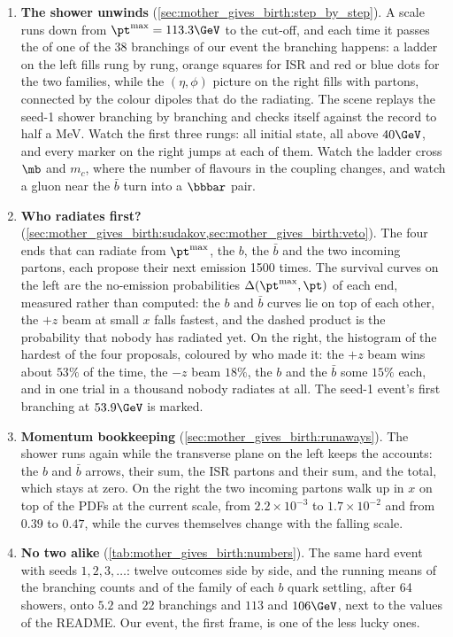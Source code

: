 \begin{enumerate}
  \item \textbf{The shower unwinds} (\cref{sec:mother_gives_birth:step_by_step}).
    A scale runs down from $\pt^{\max}=113.3\GeV$ to the cut-off, and each
    time it passes the \pt of one of the 38 branchings of our event the
    branching happens: a ladder on the left fills rung by rung, orange
    squares for ISR and red or blue dots for the two families, while the
    $(\eta,\phi)$ picture on the right fills with partons, connected by the
    colour dipoles that do the radiating. The scene replays the seed-1
    shower branching by branching and checks itself against the record to
    half a MeV. Watch the first three rungs: all initial state, all above
    $40\GeV$, and every marker on the right jumps at each of them. Watch the
    ladder cross $\mb$ and $m_c$, where the number of flavours in the
    coupling changes, and watch a gluon near the $\bar b$ turn into a
    $\bbbar$ pair.
  \item \textbf{Who radiates first?} (\cref{sec:mother_gives_birth:sudakov,sec:mother_gives_birth:veto}).
    The four ends that can radiate from $\pt^{\max}$, the $b$, the $\bar b$
    and the two incoming partons, each propose their next emission 1500
    times. The survival curves on the left are the no-emission probabilities
    $\Delta(\pt^{\max},\pt)$ of each end, measured rather than computed:
    the $b$ and $\bar b$ curves lie on top of each other, the $+z$ beam at
    small $x$ falls fastest, and the dashed product is the probability that
    nobody has radiated yet. On the right, the histogram of the hardest of
    the four proposals, coloured by who made it: the $+z$ beam wins about
    $53\%$ of the time, the $-z$ beam $18\%$, the $b$ and the $\bar b$ some
    $15\%$ each,
    and in one trial in a thousand nobody radiates at all. The seed-1
    event's first branching at $53.9\GeV$ is marked.
  \item \textbf{Momentum bookkeeping} (\cref{sec:mother_gives_birth:runaways}).
    The shower runs again while the transverse plane on the left keeps the
    accounts: the $b$ and $\bar b$ arrows, their sum, the ISR partons and
    their sum, and the total, which stays at zero. On the right the two
    incoming partons walk up in $x$ on top of the PDFs at the current
    scale, from $2.2\times10^{-3}$ to $1.7\times10^{-2}$ and from $0.39$ to
    $0.47$, while the curves themselves change with the falling scale.
  \item \textbf{No two alike} (\cref{tab:mother_gives_birth:numbers}). The
    same hard event with seeds $1,2,3,\ldots$: twelve outcomes side by side,
    and the running means of the branching counts and of the family \pt of
    each $b$ quark settling, after 64 showers, onto $5.2$ and $22$
    branchings and $113$ and $106\GeV$, next to the \PYTHIA values of the
    README. Our event, the first frame, is one of the less lucky ones.
\end{enumerate}
